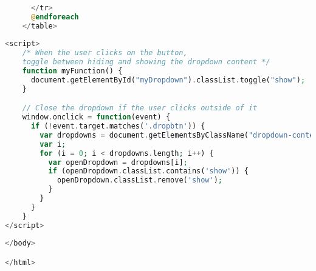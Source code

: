 \begin{lstlisting}[language=PHP, caption=skripsi\_perangkat.blade.php]
        
      </tr>
      @endforeach
    </table>
    
<script>
    /* When the user clicks on the button, 
    toggle between hiding and showing the dropdown content */
    function myFunction() {
      document.getElementById("myDropdown").classList.toggle("show");
    }

    // Close the dropdown if the user clicks outside of it
    window.onclick = function(event) {
      if (!event.target.matches('.dropbtn')) {
        var dropdowns = document.getElementsByClassName("dropdown-content");
        var i;
        for (i = 0; i < dropdowns.length; i++) {
          var openDropdown = dropdowns[i];
          if (openDropdown.classList.contains('show')) {
            openDropdown.classList.remove('show');
          }
        }
      }
    }
</script>
    
</body>

</html>
\end{lstlisting}

